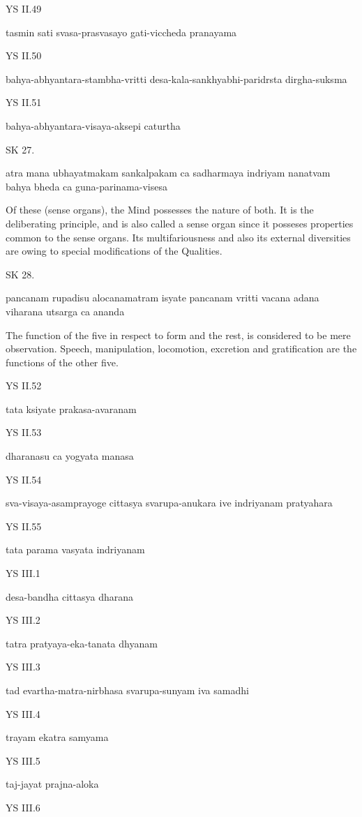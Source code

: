 YS II.49

    tasmin sati svasa-prasvasayo gati-viccheda pranayama

YS II.50

    bahya-abhyantara-stambha-vritti desa-kala-sankhyabhi-paridrsta dirgha-suksma

YS II.51

    bahya-abhyantara-visaya-aksepi caturtha

SK 27.

atra mana ubhayatmakam sankalpakam ca sadharmaya indriyam
nanatvam bahya bheda ca guna-parinama-visesa

Of these (sense organs), the Mind possesses the nature of both.
It is the deliberating principle, and is also called a sense organ
since it posseses properties common to the sense organs.
Its multifariousness and also its external diversities are owing
to special modifications of the Qualities.

SK 28.

pancanam rupadisu alocanamatram isyate
pancanam vritti vacana adana viharana utsarga ca ananda

The function of the five in respect to form and the rest,
is considered to be mere observation.
Speech, manipulation, locomotion, excretion and gratification
are the functions of the other five.

YS II.52

    tata ksiyate prakasa-avaranam

YS II.53

    dharanasu ca yogyata manasa

YS II.54

    sva-visaya-asamprayoge cittasya svarupa-anukara ive indriyanam pratyahara

YS II.55

    tata parama vasyata indriyanam

YS III.1

    desa-bandha cittasya dharana

YS III.2

    tatra pratyaya-eka-tanata dhyanam

YS III.3

    tad evartha-matra-nirbhasa svarupa-sunyam iva samadhi

YS III.4

    trayam ekatra samyama

YS III.5

    taj-jayat prajna-aloka

YS III.6

